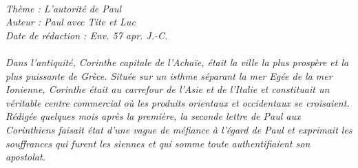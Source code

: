 \BFont
\noindent\hrulefill
\textit{
\bigskip
{\centering{}
\\Thème : L'autorité de Paul
\\Auteur : Paul avec Tite et Luc
\\Date de rédaction : Env. 57 apr. J.-C.\\}
}
\textit{
\\Dans l’antiquité, Corinthe capitale de l’Achaïe, était la ville la plus prospère et la plus puissante de Grèce. Située sur un isthme séparant la mer Egée de la mer Ionienne, Corinthe était au carrefour de l’Asie et de l’Italie et constituait un véritable centre commercial où les produits orientaux et occidentaux se croisaient.
\bigskip
\\Rédigée quelques mois après la première, la seconde lettre de Paul aux Corinthiens faisait état d’une vague de méfiance à l’égard de Paul et exprimait les souffrances qui furent les siennes et qui somme toute authentifiaient son apostolat.\bigskip
}
\par\nobreak\noindent\hrulefill
